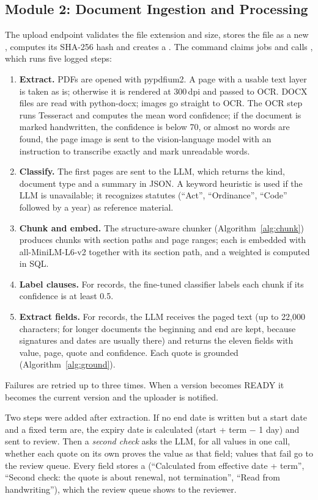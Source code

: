 \subsection{Module 2: Document Ingestion and Processing}
The upload endpoint validates the file extension and size, stores the file as a new
, computes its SHA-256 hash and creates a . The
 command claims jobs and calls , which runs five logged steps:
\begin{enumerate}
\item \textbf{Extract.} PDFs are opened with pypdfium2. A page with a usable text layer is taken as is;
otherwise it is rendered at 300\,dpi and passed to OCR. DOCX files are read with python-docx; images go
straight to OCR. The OCR step runs Tesseract and computes the mean word confidence; if the document is
marked handwritten, the confidence is below 70, or almost no words are found, the page image is sent to
the vision-language model with an instruction to transcribe exactly and mark unreadable words.
\item \textbf{Classify.} The first pages are sent to the LLM, which returns the kind, document type and a
summary in JSON. A keyword heuristic is used if the LLM is unavailable; it recognizes statutes (``Act'',
``Ordinance'', ``Code'' followed by a year) as reference material.
\item \textbf{Chunk and embed.} The structure-aware chunker (Algorithm~\ref{alg:chunk}) produces chunks
with section paths and page ranges; each is embedded with all-MiniLM-L6-v2 together with its section
path, and a weighted  is computed in SQL.
\item \textbf{Label clauses.} For records, the fine-tuned classifier labels each chunk if its confidence
is at least 0.5.
\item \textbf{Extract fields.} For records, the LLM receives the paged text (up to 22,000 characters; for
longer documents the beginning and end are kept, because signatures and dates are usually there) and
returns the eleven fields with value, page, quote and confidence. Each quote is grounded
(Algorithm~\ref{alg:ground}).
\end{enumerate}
Failures are retried up to three times. When a version becomes READY it becomes the current version and
the uploader is notified.

Two steps were added after extraction. If no end date is written but a start date and a fixed term are, the
expiry date is calculated (start + term $-$ 1 day) and sent to review. Then a \emph{second check} asks the LLM,
for all values in one call, whether each quote on its own proves the value as that field; values that fail
go to the review queue. Every field stores a  (``Calculated from effective date + term'',
``Second check: the quote is about renewal, not termination'', ``Read from handwriting''), which the review
queue shows to the reviewer.

